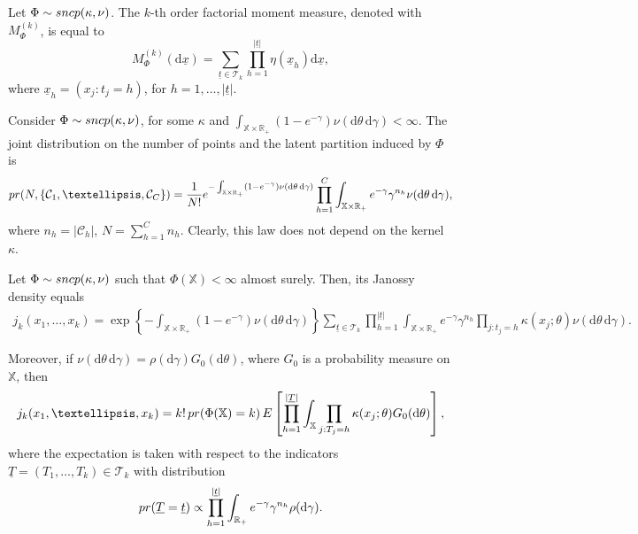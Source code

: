 \documentclass[10pt,a4paper]{amsart}
\newcommand{\E}{E}
\newcommand{\R}{\mathbb{R}}
\newcommand{\X}{\mathbb{X}}
\newcommand{\calC}{\mathcal{C}}
\newcommand{\calT}{\mathcal{T}}
\newcommand{\dd}{\mathrm d}
\newcommand{\prob}{{\rm pr}}
\begin{document}
\begin{lemma}\label{lemma:k_factorial_sncp}
Let $\Phi \sim \textsc{sncp}(\kappa, \nu)$. The $k$-th order factorial moment measure, denoted with $M^{(k)}_{\Phi}$, is equal to 
\[
M^{(k)}_{\Phi}(\dd \underline{x}) = \sum_{\underline{t} \in \calT_k} \prod_{h=1}^{|\underline{t}|} \eta(\underline{x}_h)\dd \underline{x},
\]
where $\underline{x}_h = (x_j: t_j = h)$, for $h=1,\ldots,|\underline{t}|$.
\end{lemma}

\begin{theorem}\label{prop:prior_partition_sncp}
Consider $\Phi \sim \textsc{sncp}(\kappa, \nu)$, for some $\kappa$ and $\int_{\X\times \R_+} (1-e^{-\gamma} ) \nu(\dd\theta \, \dd \gamma) < \infty$. The joint distribution on the number of points and the latent partition induced by $\Phi$ is
\[
\prob(N, \{\calC_1,\ldots, \calC_C\}) = \frac{1}{N!} e^{- \int_{\X\times\R_+}(1-e^{-\gamma}) \nu(\dd\theta \, \dd \gamma)} \prod_{h = 1}^C \int_{\X\times \R_+} e^{-\gamma} \gamma^{n_h} \nu(\dd\theta \, \dd \gamma), 
\]
where $n_h = | \calC_h |$, $N = \sum_{h=1}^C n_h$. Clearly, this law does not depend on the kernel $\kappa$.
\end{theorem}

\begin{theorem}
    Let $\Phi \sim \textsc{sncp}(\kappa, \nu)$ such that $\Phi(\X) < \infty$ almost surely. Then, its Janossy density equals
    \begin{equation*}
        \begin{aligned}
            j_k(x_1,\ldots,x_k) = \exp\left\{ - \int_{\X\times \R_+} ( 1 - e^{-\gamma}) \nu(\dd \theta\, \dd \gamma) \right\} \sum_{\underline{t} \in \calT_k} \prod_{h=1}^{|\underline{t}|} \int_{\X\times \R_+} e^{-\gamma} \gamma^{n_h} \prod_{j: t_j = h} \kappa(x_j ; \theta) \nu(\dd \theta \,\dd \gamma).
        \end{aligned}
    \end{equation*}
     
 
 Moreover, if $\nu(\dd \theta\, \dd \gamma) = \rho(\dd \gamma) G_0(\dd \theta) $, where $G_0$ is a probability measure on $\X$, then 
\begin{equation*}
    j_k(x_1,\ldots,x_k) = k! \, \prob( \Phi(\X) = k) \,\E\left[\prod_{h=1}^{|\underline{T}|} \int_{\X}\prod_{j: T_j = h} \kappa(x_j ; \theta) G_0(\dd \theta)\right],
\end{equation*}
where the expectation is taken with respect to the indicators $\underline{T} = (T_1, \ldots, T_k) \in \calT_k$ with distribution
\begin{equation*}
\prob(\underline{T} = \underline{t}) \propto  \prod_{h=1}^{|\underline{t}|} \int_{\R_+} e^{-\gamma} \gamma^{n_h} \rho(\dd \gamma) .    
\end{equation*}
\end{theorem}
\end{document}
